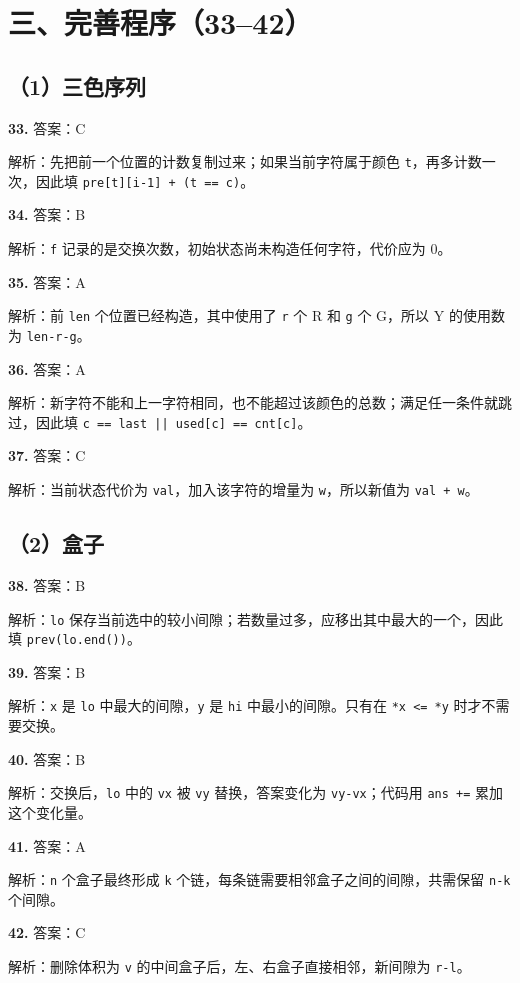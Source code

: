 \documentclass[a4paper]{ctexart}
\newcommand{\ans}[2]{\noindent\textbf{#1} \quad 答案：#2\par}
\newcommand{\expn}[1]{\hspace*{1.5em}解析：#1\par}
\begin{document}
\section*{三、完善程序（33--42）}
\subsection*{（1）三色序列}
\ans{33.}{C}\expn{先把前一个位置的计数复制过来；如果当前字符属于颜色 \texttt{t}，再多计数一次，因此填 \texttt{pre[t][i-1] + (t == c)}。}
\ans{34.}{B}\expn{\texttt{f} 记录的是交换次数，初始状态尚未构造任何字符，代价应为 0。}
\ans{35.}{A}\expn{前 \texttt{len} 个位置已经构造，其中使用了 \texttt{r} 个 R 和 \texttt{g} 个 G，所以 Y 的使用数为 \texttt{len-r-g}。}
\ans{36.}{A}\expn{新字符不能和上一字符相同，也不能超过该颜色的总数；满足任一条件就跳过，因此填 \texttt{c == last || used[c] == cnt[c]}。}
\ans{37.}{C}\expn{当前状态代价为 \texttt{val}，加入该字符的增量为 \texttt{w}，所以新值为 \texttt{val + w}。}

\subsection*{（2）盒子}
\ans{38.}{B}\expn{\texttt{lo} 保存当前选中的较小间隙；若数量过多，应移出其中最大的一个，因此填 \texttt{prev(lo.end())}。}
\ans{39.}{B}\expn{\texttt{x} 是 \texttt{lo} 中最大的间隙，\texttt{y} 是 \texttt{hi} 中最小的间隙。只有在 \texttt{*x <= *y} 时才不需要交换。}
\ans{40.}{B}\expn{交换后，\texttt{lo} 中的 \texttt{vx} 被 \texttt{vy} 替换，答案变化为 \texttt{vy-vx}；代码用 \texttt{ans +=} 累加这个变化量。}
\ans{41.}{A}\expn{\texttt{n} 个盒子最终形成 \texttt{k} 个链，每条链需要相邻盒子之间的间隙，共需保留 \texttt{n-k} 个间隙。}
\ans{42.}{C}\expn{删除体积为 \texttt{v} 的中间盒子后，左、右盒子直接相邻，新间隙为 \texttt{r-l}。}
\end{document}
